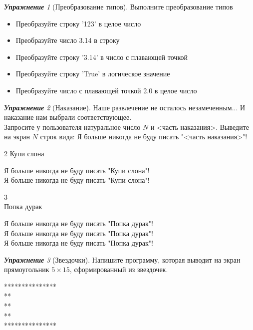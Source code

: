 \documentclass[a4,12pt]{article}
\theoremstyle{remark}
\newtheorem{exercise}{\textbf{Упражнение}}[section]
\begin{document}
\begin{exercise}[Преобразование типов]
Выполните преобразование типов
\begin{itemize}
    \item Преобразуйте строку '123' в целое число
    \item Преобразуйте число 3.14 в строку
    \item Преобразуйте строку '3.14' в число с плавающей точкой
    \item Преобразуйте строку 'True' в логическое значение
    \item Преобразуйте число с плавающей точкой 2.0 в целое число
\end{itemize}
\end{exercise}

\pagebreak

\begin{exercise}[Наказание]
Наше развлечение не осталось незамеченным...
И наказание нам выбрали соответствующее.\\
Запросите у пользователя натуральное число $N$ и <часть наказания>. 
Выведите на экран $N$ строк вида: Я больше никогда не буду писать "<часть наказания>"!

\begin{inputformat}
2
Купи слона
\end{inputformat}

\begin{outputformat}
Я больше никогда не буду писать "Купи слона"! \\
Я больше никогда не буду писать "Купи слона"!
\end{outputformat}

\begin{inputformat}
3 \\
Попка дурак
\end{inputformat}

\begin{outputformat}
Я больше никогда не буду писать "Попка дурак"! \\
Я больше никогда не буду писать "Попка дурак"! \\
Я больше никогда не буду писать "Попка дурак"!
\end{outputformat}
\end{exercise}

\begin{exercise}[Звездочки]
Напишите программу, которая выводит на экран прямоугольник $5 \times 15$, сформированный из звездочек.

\begin{outputformat}
***************\\
*\hspace{6.5em}* \\
*\hspace{6.5em}* \\
*\hspace{6.5em}* \\
***************
\end{outputformat}
\end{exercise}
\end{document}
